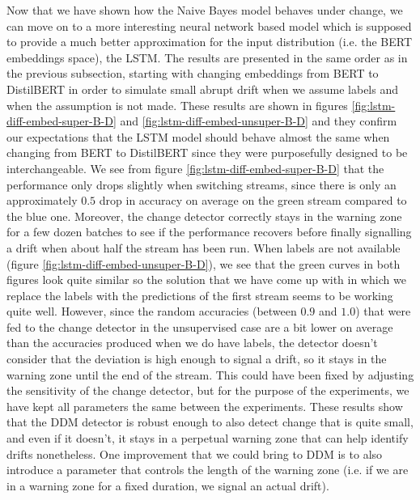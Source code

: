 \documentclass[12pt]{extreport}
\begin{document}
Now that we have shown how the Naive Bayes model behaves under change, we can move on to a more interesting neural network based model which is supposed to provide a much better approximation for the input distribution (i.e. the BERT embeddings space), the LSTM. The results are presented in the same order as in the previous subsection, starting with changing embeddings from BERT to DistilBERT in order to simulate small abrupt drift when we assume labels and when the assumption is not made. These results are shown in figures \ref{fig:lstm-diff-embed-super-B-D} and \ref{fig:lstm-diff-embed-unsuper-B-D} and they confirm our expectations that the LSTM model should behave almost the same when changing from BERT to DistilBERT since they were purposefully designed to be interchangeable. We see from figure \ref{fig:lstm-diff-embed-super-B-D} that the performance only drops slightly when switching streams, since there is only an approximately $0.5$ drop in accuracy on average on the green stream compared to the blue one. Moreover, the change detector correctly stays in the warning zone for a few dozen batches to see if the performance recovers before finally signalling a drift when about half the stream has been run. When labels are not available (figure \ref{fig:lstm-diff-embed-unsuper-B-D}), we see that the green curves in both figures look quite similar so the solution that we have come up with in which we replace the labels with the predictions of the first stream seems to be working quite well. However, since the random accuracies (between $0.9$ and $1.0$) that were fed to the change detector in the unsupervised case are a bit lower on average than the accuracies produced when we do have labels, the detector doesn't consider that the deviation is high enough to signal a drift, so it stays in the warning zone until the end of the stream. This could have been fixed by adjusting the sensitivity of the change detector, but for the purpose of the experiments, we have kept all parameters the same between the experiments. These results show that the DDM detector is robust enough to also detect change that is quite small, and even if it doesn't, it stays in a perpetual warning zone that can help identify drifts nonetheless. One improvement that we could bring to DDM is to also introduce a parameter that controls the length of the warning zone (i.e. if we are in a warning zone for a fixed duration, we signal an actual drift).
\end{document}
